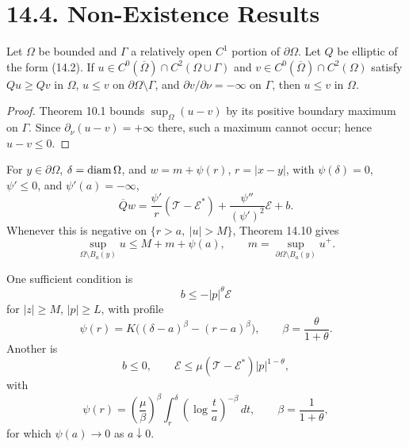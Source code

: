 \section*{14.4. Non-Existence Results}

\begin{theorem}
\label{gt14-boundary-gradient-14-10}
Let $\Omega$ be bounded and $\Gamma$ a relatively open $C^1$ portion of
$\partial\Omega$. Let $Q$ be elliptic of the form (14.2). If
$u\in C^0(\overline\Omega)\cap C^2(\Omega\cup\Gamma)$ and
$v\in C^0(\overline\Omega)\cap C^2(\Omega)$ satisfy
$Qu\geq Qv$ in $\Omega$, $u\leq v$ on
$\partial\Omega\setminus\Gamma$, and
$\partial v/\partial\nu=-\infty$ on $\Gamma$, then $u\leq v$ in $\Omega$.
\end{theorem}
\begin{proof}
\sketch Theorem 10.1 bounds $\sup_\Omega(u-v)$ by its positive boundary
maximum on $\Gamma$. Since
$\partial_\nu(u-v)=+\infty$ there, such a maximum cannot occur; hence
$u-v\leq0$.
\end{proof}

For $y\in\partial\Omega$, $\delta=\operatorname{diam}\Omega$, and
$w=m+\psi(r)$, $r=|x-y|$, with
$\psi(\delta)=0$, $\psi'\leq0$, and $\psi'(a)=-\infty$,
\begin{equation}
\overline Qw
=\frac{\psi'}r(\mathcal T-\mathcal E^*)
+\frac{\psi''}{(\psi')^2}\mathcal E+b.
\tag{14.62}
\end{equation}
Whenever this is negative on $\{r>a,\ |u|>M\}$, Theorem 14.10 gives
\begin{equation}
\sup_{\Omega\setminus B_a(y)}u\leq M+m+\psi(a),
\qquad
m=\sup_{\partial\Omega\setminus B_a(y)}u^+.
\tag{14.63}
\end{equation}

One sufficient condition is
\begin{equation}
b\leq-|p|^\theta\mathcal E
\tag{14.64}
\end{equation}
for $|z|\geq M$, $|p|\geq L$, with profile
\begin{equation}
\psi(r)=K\bigl((\delta-a)^\beta-(r-a)^\beta\bigr),
\qquad \beta=\frac{\theta}{1+\theta}.
\tag{14.65}
\end{equation}
Another is
\begin{equation}
b\leq0,\qquad
\mathcal E\leq\mu(\mathcal T-\mathcal E^*)|p|^{1-\theta},
\tag{14.66}
\end{equation}
with
\begin{equation}
\psi(r)=\left(\frac\mu\beta\right)^\beta
\int_r^\delta\left(\log\frac ta\right)^{-\beta}\,dt,
\qquad \beta=\frac1{1+\theta},
\tag{14.67}
\end{equation}
for which $\psi(a)\to0$ as $a\downarrow0$.


